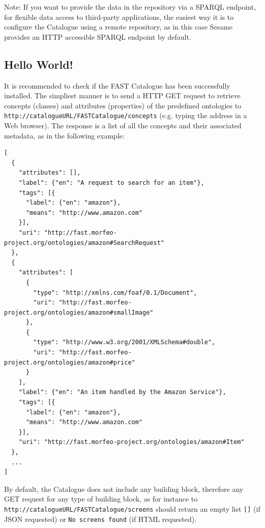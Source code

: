 \documentclass{fast_latex}
\begin{document}
Note: If you want to provide the data in the repository via a SPARQL endpoint, for flexible data access to third-party applications, the easiest way it is to configure the Catalogue using a remote repository, as in this case Sesame provides an HTTP accessible SPARQL endpoint by default.



\subsection{Hello World!} %
\label{sub:hello_world}

It is recommended to check if the FAST Catalogue has been successfully installed. The simpliest manner is to send a HTTP GET request to retrieve concepts (classes) and attributes (properties) of the predefined ontologies to \verb|http://catalogueURL/FASTCatalogue/concepts| (e.g. typing the address in a Web browser). The response is a list of all the concepts and their associated metadata, as in the following example:

\singlespacing
\begin{verbatim}
[
  {
    "attributes": [],
    "label": {"en": "A request to search for an item"},
    "tags": [{
      "label": {"en": "amazon"},
      "means": "http://www.amazon.com"
    }],
    "uri": "http://fast.morfeo-project.org/ontologies/amazon#SearchRequest"
  },
  {
    "attributes": [
      {
        "type": "http://xmlns.com/foaf/0.1/Document",
        "uri": "http://fast.morfeo-project.org/ontologies/amazon#smallImage"
      },
      {
        "type": "http://www.w3.org/2001/XMLSchema#double",
        "uri": "http://fast.morfeo-project.org/ontologies/amazon#price"
      }
    ],
    "label": {"en": "An item handled by the Amazon Service"},
    "tags": [{
      "label": {"en": "amazon"},
      "means": "http://www.amazon.com"
    }],
    "uri": "http://fast.morfeo-project.org/ontologies/amazon#Item"
  },
  ...
]
\end{verbatim}
\doublespacing

By default, the Catalogue does not include any building block, therefore any GET request for any type of building block, as for instance to \verb|http://catalogueURL/FASTCatalogue/screens| should return an empty list \verb|[]| (if JSON requested) or \verb|No screens found| (if HTML requested).


\end{document}
